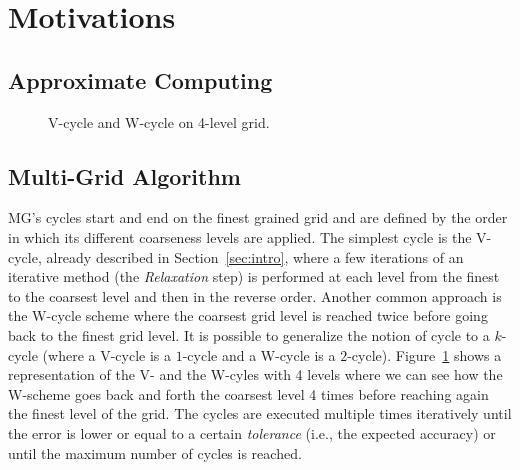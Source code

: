 \section{Motivations}
\label{sec:motivation}


\subsection{Approximate Computing}
\label{sec:approx}


\begin{figure}[hbt]
 \resizebox{\linewidth}{!}{
    
 }
 \caption{V-cycle and W-cycle on 4-level grid.}
 \label{fig.cycles}
\end{figure}

\subsection{Multi-Grid Algorithm}
\label{sec:algo}

MG's cycles start and end on the finest grained grid and are defined by the
order in which its different coarseness levels are applied.  The simplest cycle
is the V-cycle, already described in Section~\ref{sec:intro}, where a few
iterations of an iterative method (the \textit{Relaxation} step) is performed
at each level from the finest to the coarsest level and then in the reverse
order.  Another common approach is the W-cycle scheme where the coarsest grid
level is reached twice before going back to the finest grid level.  It is
possible to generalize the notion of cycle to a $k$-cycle (where a V-cycle is a
$1$-cycle and a W-cycle is a $2$-cycle).  Figure~\ref{fig.cycles} shows a
representation of the V- and the W-cyles with 4 levels where we can see how the
W-scheme goes back and forth the coarsest level 4 times before reaching again
the finest level of the grid.  The cycles are executed multiple times
iteratively until the error is lower or equal to a certain \emph{tolerance}
(i.e., the expected accuracy) or until the maximum number of cycles is reached.

